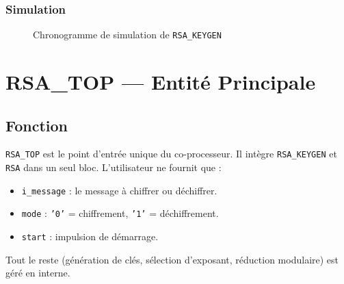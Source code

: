 \documentclass[12pt,a4paper]{report}
\begin{document}
\subsubsection{Simulation}
\begin{figure}[H]
\centering
{}
\caption{Chronogramme de simulation de \texttt{RSA\_KEYGEN}}
\label{fig:sim_keygen}
\end{figure}


\section{RSA\_TOP --- Entité Principale}
\label{ch:top}

\subsection{Fonction}

\texttt{RSA\_TOP} est le point d'entrée unique du co-processeur. Il intègre
\texttt{RSA\_KEYGEN} et \texttt{RSA} dans un seul bloc. L'utilisateur
ne fournit que :
\begin{itemize}
  \item \texttt{i\_message} : le message à chiffrer ou déchiffrer.
  \item \texttt{mode} : \texttt{'0'} = chiffrement, \texttt{'1'} = déchiffrement.
  \item \texttt{start} : impulsion de démarrage.
\end{itemize}

Tout le reste (génération de clés, sélection d'exposant, réduction modulaire)
est géré en interne.
\end{document}
